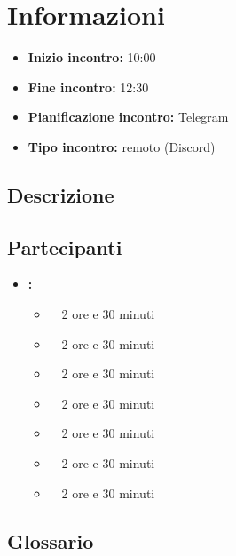 \section{Informazioni}
\begin{itemize}
	\item \textbf{Inizio incontro:} 10:00
	\item \textbf{Fine incontro:} 12:30
	\item \textbf{Pianificazione incontro:} Telegram
	\item \textbf{Tipo incontro:} remoto (Discord)
\end{itemize}

\subsection{Descrizione}
\DocDescription

\subsection{Partecipanti}

\begin{itemize}
	\item \textbf{\GroupName:}
	\begin{itemize}
		\item \tommaso \ \rightarrow\ 2 ore e 30 minuti
		\item \marco \ \rightarrow\ 2 ore e 30 minuti
		\item \raul \ \rightarrow\ 2 ore e 30 minuti
		\item \sebastiano \ \rightarrow\ 2 ore e 30 minuti
		\item \martina \ \rightarrow\ 2 ore e 30 minuti
		\item \riccardo \ \rightarrow\ 2 ore e 30 minuti
		\item \mattia \ \rightarrow\ 2 ore e 30 minuti
	\end{itemize}
\end{itemize}

\subsection{Glossario}
\GlossarioIntroduzione

\clearpage